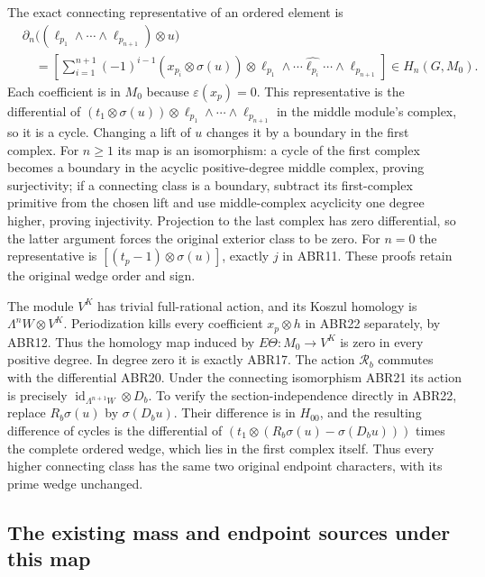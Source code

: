 \documentclass[11pt]{article}
\begin{document}
The exact connecting representative of an ordered element is
\begin{equation}\tag{ABR22}
 \begin{split}
 &\partial_n\bigl((\ell_{p_1}\wedge\cdots\wedge\ell_{p_{n+1}})
                                                    \otimes u\bigr)\\
 &\quad=\left[
  \sum_{i=1}^{n+1}(-1)^{i-1}
       (x_{p_i}\otimes\sigma(u))\otimes
       \ell_{p_1}\wedge\cdots\widehat{\ell_{p_i}}\cdots
                                  \wedge\ell_{p_{n+1}}
         \right]\in H_n(G,M_0).
 \end{split}
\end{equation}
Each coefficient is in $M_0$ because $\varepsilon(x_p)=0$.
This representative is the differential of
$(t_1\otimes\sigma(u))\otimes
  \ell_{p_1}\wedge\cdots\wedge\ell_{p_{n+1}}$
in the middle module's complex, so it is a cycle. Changing a
lift of $u$ changes it by a boundary in the first complex.
For $n\ge1$ its map is an isomorphism: a cycle of the first
complex becomes a boundary in the acyclic positive-degree middle
complex, proving surjectivity; if a connecting class is a boundary,
subtract its first-complex primitive from the chosen lift and use
middle-complex acyclicity one degree higher, proving injectivity.
Projection to the last complex has zero differential, so the latter
argument forces the original exterior class to be zero. For $n=0$
the representative is $[(t_p-1)\otimes\sigma(u)]$, exactly $j$ in
ABR11. These proofs retain the original wedge order and sign.

The module $V^K$ has trivial full-rational action, and its Koszul
homology is $\Lambda^nW\otimes V^K$. Periodization kills every
coefficient $x_p\otimes h$ in ABR22 separately, by ABR12. Thus
the homology map induced by $E\Theta:M_0\to V^K$ is zero in
every positive degree. In degree zero it is exactly ABR17.
The action $\mathscr R_b$ commutes with the differential ABR20.
Under the connecting isomorphism ABR21 its action is precisely
$\operatorname{id}_{\Lambda^{n+1}W}\otimes D_b$. To verify the
section-independence directly in ABR22, replace $R_b\sigma(u)$
by $\sigma(D_bu)$. Their difference is in $H_{00}$, and the
resulting difference of cycles is the differential of
$(t_1\otimes(R_b\sigma(u)-\sigma(D_bu)))$
times the complete ordered wedge, which lies in the first
complex itself. Thus every higher connecting class has the same
two original endpoint characters, with its prime wedge unchanged.

\subsection{The existing mass and endpoint sources under this map}
\end{document}
